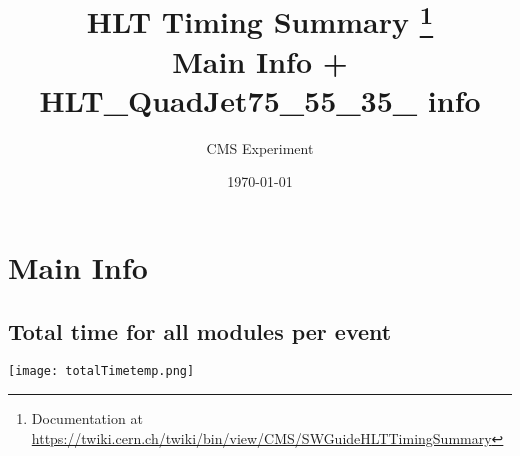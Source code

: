 \documentclass[10pt,a5paper,landscape]{report}
\title{ \textbf{\Huge{HLT Timing Summary}} \footnote{\large{Documentation at \url{https://twiki.cern.ch/twiki/bin/view/CMS/SWGuideHLTTimingSummary}}} \\ Main Info + HLT\_QuadJet75\_55\_35\_ info }
\author{\Large{CMS Experiment}}
\date{\today}
\begin{document}
\maketitle
\tableofcontents 
\newpage
 \chapter{Main Info} 
\newpage \centering \section{Total time for all modules per event} \texttt{[image: totalTimetemp.png]}
\end{document}
